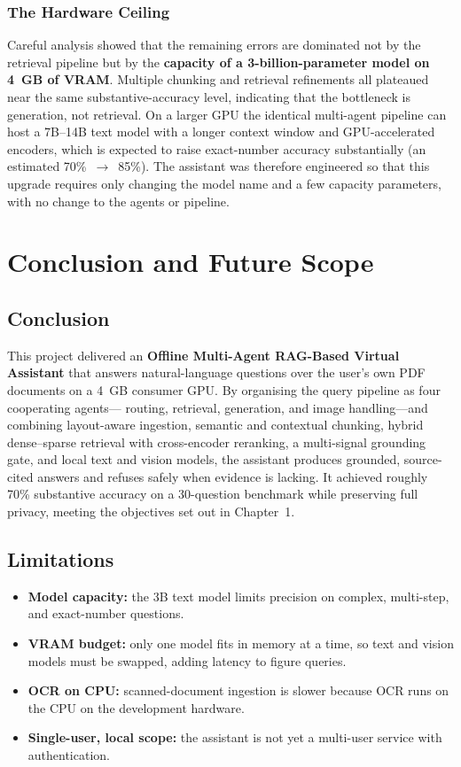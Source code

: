 \documentclass[12pt,a4paper]{report}
\begin{document}
\subsection{The Hardware Ceiling}
Careful analysis showed that the remaining errors are dominated not by the
retrieval pipeline but by the \textbf{capacity of a 3-billion-parameter model on
4~GB of VRAM}. Multiple chunking and retrieval refinements all plateaued near the
same substantive-accuracy level, indicating that the bottleneck is generation, not
retrieval. On a larger GPU the identical multi-agent pipeline can host a 7B--14B
text model with a longer context window and GPU-accelerated encoders, which is
expected to raise exact-number accuracy substantially (an estimated
70\%~$\rightarrow$~85\%). The assistant was therefore engineered so that this
upgrade requires only changing the model name and a few capacity parameters, with
no change to the agents or pipeline.

\chapter{Conclusion and Future Scope}

\section{Conclusion}
This project delivered an \textbf{Offline Multi-Agent RAG-Based Virtual Assistant}
that answers natural-language questions over the user's own PDF documents on a
4~GB consumer GPU. By organising the query pipeline as four cooperating agents---
routing, retrieval, generation, and image handling---and combining layout-aware
ingestion, semantic and contextual chunking, hybrid dense--sparse retrieval with
cross-encoder reranking, a multi-signal grounding gate, and local text and vision
models, the assistant produces grounded, source-cited answers and refuses safely
when evidence is lacking. It achieved roughly 70\% substantive accuracy on a
30-question benchmark while preserving full privacy, meeting the objectives set out
in Chapter~1.

\section{Limitations}
\begin{itemize}[leftmargin=1.4em]
  \item \textbf{Model capacity:} the 3B text model limits precision on complex,
        multi-step, and exact-number questions.
  \item \textbf{VRAM budget:} only one model fits in memory at a time, so text and
        vision models must be swapped, adding latency to figure queries.
  \item \textbf{OCR on CPU:} scanned-document ingestion is slower because OCR runs
        on the CPU on the development hardware.
  \item \textbf{Single-user, local scope:} the assistant is not yet a multi-user
        service with authentication.
\end{itemize}
\end{document}
